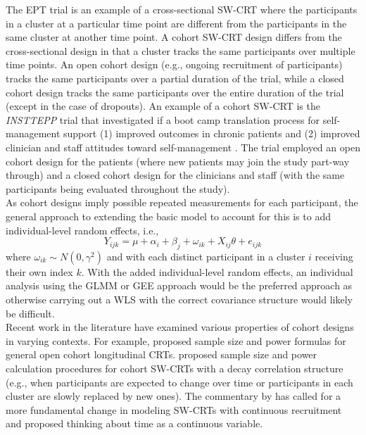 \documentclass[10pt]{article}
\begin{document}
The EPT trial is an example of a cross-sectional SW-CRT where the participants in a cluster at a particular time point are different from the participants in the same cluster at another time point. A cohort SW-CRT design differs from the cross-sectional design in that a cluster tracks the same participants over multiple time points. An open cohort design (e.g., ongoing recruitment of participants) tracks the same participants over a partial duration of the trial, while a closed cohort design tracks the same participants over the entire duration of the trial (except in the case of dropouts). An example of a cohort SW-CRT is the \textit{INSTTEPP} trial that investigated if a boot camp translation process for self-management support (1) improved outcomes in chronic patients and (2) improved clinician and staff attitudes toward self-management \parencite{Nease:2018}. The trial employed an open cohort design for the patients (where new patients may join the study part-way through) and a closed cohort design for the clinicians and staff (with the same participants being evaluated throughout the study).
\\

As cohort designs imply possible repeated measurements for each participant, the general approach to extending the basic model to account for this is to add individual-level random effects, i.e.,
\[
Y_{ijk} = \mu + \alpha_i + \beta_j + \omega_{ik} + X_{ij}\theta + e_{ijk}
\]
where $\omega_{ik}\sim N(0,\gamma^2)$ and with each distinct participant in a cluster $i$ receiving their own index $k$. With the added individual-level random effects, an individual analysis using the GLMM or GEE approach would be the preferred approach as otherwise carrying out a WLS with the correct covariance structure would likely be difficult.
\\

Recent work in the literature have examined various properties of cohort designs in varying contexts. For example, \textcite{Kasza:2020} proposed sample size and power formulas for general open cohort longitudinal CRTs. \textcite{Li:2020} proposed sample size and power calculation procedures for cohort SW-CRTs with a decay correlation structure (e.g., when participants are expected to change over time or participants in each cluster are slowly replaced by new ones). The commentary by \textcite{Hooper:2019} has called for a more fundamental change in modeling SW-CRTs with continuous recruitment and proposed thinking about time as a continuous variable.
\end{document}

